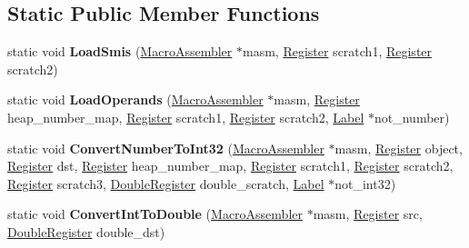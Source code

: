 \subsection*{Static Public Member Functions}
\begin{DoxyCompactItemize}
\item 
static void {\bfseries Load\+Smis} (\hyperlink{classv8_1_1internal_1_1_macro_assembler}{Macro\+Assembler} $\ast$masm, \hyperlink{structv8_1_1internal_1_1_register}{Register} scratch1, \hyperlink{structv8_1_1internal_1_1_register}{Register} scratch2)\hypertarget{classv8_1_1internal_1_1_floating_point_helper_a4cfbc194f798abc014023d6d1379e986}{}\label{classv8_1_1internal_1_1_floating_point_helper_a4cfbc194f798abc014023d6d1379e986}

\item 
static void {\bfseries Load\+Operands} (\hyperlink{classv8_1_1internal_1_1_macro_assembler}{Macro\+Assembler} $\ast$masm, \hyperlink{structv8_1_1internal_1_1_register}{Register} heap\+\_\+number\+\_\+map, \hyperlink{structv8_1_1internal_1_1_register}{Register} scratch1, \hyperlink{structv8_1_1internal_1_1_register}{Register} scratch2, \hyperlink{classv8_1_1internal_1_1_label}{Label} $\ast$not\+\_\+number)\hypertarget{classv8_1_1internal_1_1_floating_point_helper_acac74ef2f1b9dc8302eb6bcc2ee76968}{}\label{classv8_1_1internal_1_1_floating_point_helper_acac74ef2f1b9dc8302eb6bcc2ee76968}

\item 
static void {\bfseries Convert\+Number\+To\+Int32} (\hyperlink{classv8_1_1internal_1_1_macro_assembler}{Macro\+Assembler} $\ast$masm, \hyperlink{structv8_1_1internal_1_1_register}{Register} object, \hyperlink{structv8_1_1internal_1_1_register}{Register} dst, \hyperlink{structv8_1_1internal_1_1_register}{Register} heap\+\_\+number\+\_\+map, \hyperlink{structv8_1_1internal_1_1_register}{Register} scratch1, \hyperlink{structv8_1_1internal_1_1_register}{Register} scratch2, \hyperlink{structv8_1_1internal_1_1_register}{Register} scratch3, \hyperlink{structv8_1_1internal_1_1_double_register}{Double\+Register} double\+\_\+scratch, \hyperlink{classv8_1_1internal_1_1_label}{Label} $\ast$not\+\_\+int32)\hypertarget{classv8_1_1internal_1_1_floating_point_helper_a4c1867d1599b2b6caf7c8a6da6866b5c}{}\label{classv8_1_1internal_1_1_floating_point_helper_a4c1867d1599b2b6caf7c8a6da6866b5c}

\item 
static void {\bfseries Convert\+Int\+To\+Double} (\hyperlink{classv8_1_1internal_1_1_macro_assembler}{Macro\+Assembler} $\ast$masm, \hyperlink{structv8_1_1internal_1_1_register}{Register} src, \hyperlink{structv8_1_1internal_1_1_double_register}{Double\+Register} double\+\_\+dst)\hypertarget{classv8_1_1internal_1_1_floating_point_helper_ae3c7411792e0e67006c16d427c0f493f}{}\label{classv8_1_1internal_1_1_floating_point_helper_ae3c7411792e0e67006c16d427c0f493f}


\end{DoxyCompactItemize}
